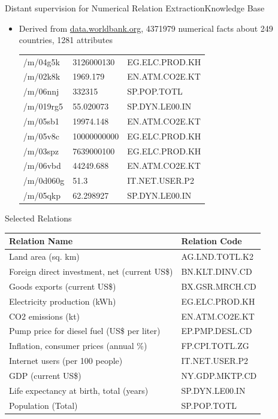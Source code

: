 \documentclass{beamer}
\begin{document}

\begin{frame}{Distant supervision for Numerical Relation Extraction}{Knowledge Base}
 \begin{itemize}
  \item Derived from \url{data.worldbank.org}, 4371979 numerical facts about 249 countries, 1281 attributes 

\begin{tabular}{|l|l|l|}
\hline
/m/04g5k&3126000130&EG.ELC.PROD.KH\\
/m/02k8k&1969.179&EN.ATM.CO2E.KT\\
/m/06nnj&332315&SP.POP.TOTL\\
/m/019rg5&55.020073&SP.DYN.LE00.IN\\
/m/05sb1&19974.148&EN.ATM.CO2E.KT\\
/m/05v8c&10000000000&EG.ELC.PROD.KH\\
/m/03spz&7639000100&EG.ELC.PROD.KH\\
/m/06vbd&44249.688&EN.ATM.CO2E.KT\\
/m/0d060g&51.3&IT.NET.USER.P2\\
/m/05qkp&62.298927&SP.DYN.LE00.IN\\
\hline
\end{tabular}


\end{itemize}

\end{frame}
\begin{frame}{Selected Relations}
 \begin{center}
\begin{tabular}{|l|l|}
\hline
Relation Name & Relation Code \\
\hline
Land area (sq. km)&AG.LND.TOTL.K2\\
Foreign direct investment, net (current US\$)&BN.KLT.DINV.CD\\
Goods exports (current US\$)&BX.GSR.MRCH.CD\\
Electricity production (kWh)&EG.ELC.PROD.KH\\
CO2 emissions (kt)&EN.ATM.CO2E.KT\\
Pump price for diesel fuel (US\$ per liter)&EP.PMP.DESL.CD\\
Inflation, consumer prices (annual \%)&FP.CPI.TOTL.ZG\\
Internet users (per 100 people)&IT.NET.USER.P2\\
GDP (current US\$)&NY.GDP.MKTP.CD\\
Life expectancy at birth, total (years)&SP.DYN.LE00.IN\\
Population (Total)&SP.POP.TOTL\\
\hline
\end{tabular}
\end{center}

\end{frame}
\end{document}
